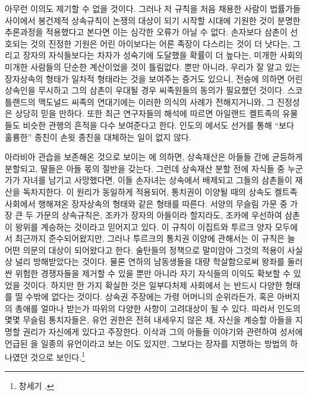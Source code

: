 아무런 이의도 제기할 수 없을 것이다.
그러나
저 규칙을 처음 채용한 사람이
법률가들 사이에서
봉건제적 상속규칙이
논쟁의 대상이 되기 시작할 시대에
기원한 것이
분명한 추론과정을
적용했다고 본다면 이는
심각한 오류가 아닐 수 없다.
손자보다 삼촌이 선호되는 것의 진정한 기원은
어린 아이보다는 어른 족장이 다스리는 것이 더 낫다는,
그리고 장자의 자식들보다는
차자가 성숙기에 도달했을 확률이 더 높다는,
미개한 사회의 미개한 사람들의 단순한 계산이었을 것이 틀림없다.
뿐만 아니라,
우리가 잘 알고 있는 장자상속의 형태가 일차적 형태라는 것을 보여주는
증거도 있으니,
전승에 의하면
어린 상속인을 무시하고 그의 삼촌이 우대될 경우
씨족원들의 동의가 필요했던 것이다.
스코틀랜드의 맥도널드 씨족의 연대기에는
이러한 의식의 사례가 전해지거니와,
그 진정성은 상당히 믿을 만하다.
또한 최근 연구자들의 해석에 따르면
아일랜드 켈트족의 유물들도 비슷한 관행의 흔적을 다수 보여준다고 한다.
인도의 에서도
선거를 통해
``보다 훌륭한'' 종친이
손윗 종친을
대체하는 일이 없지 않다.

아라비아 관습을 보존해온 것으로 보이는
에 의하면,
상속재산은 아들들 간에 균등하게 분할되고,
딸들은 아들 몫의 절반을 갖는다.
그런데 상속재산 분할 전에 자식들 중 누군가가 자녀를 남기고 사망했다면,
이들 손자녀는 상속에서 배제되고 그들의 삼촌들이 재산을 독차지한다.
이 원리가 동일하게 적용되어,
통치권이 이양될 때의 상속도
켈트족 사회에서 행해져온 장자상속의 형태와
같은 형태를 따른다.
서양의 무슬림 가문 중 가장 큰 두 가문의 상속규칙은,
조카가 장자의 아들이라 할지라도, 조카에 우선하여 삼촌이 왕위를
계승하는 것이라고 믿어지고 있다.
이 규칙이 이집트와 투르크 양자 모두에서
최근까지 준수되어왔지만,
그러나
투르크의 통치권 이양에 관해서는 이 규칙은
늘 어떤 의문의 대상이 되어왔다고 한다.
술탄들의 정책으로 말미암아 그것의 적용이 사실상 널리 방해받았다는 것이다.
물론 연하의 남동생들을 대량 학살함으로써
왕좌를 둘러싼 위험한 경쟁자들을 제거할 수 있을 뿐만 아니라
자기 자식들의 이익도 확보할 수 있었을 것이다.
하지만 한 가지 확실한 것은
일부다처제 사회에서
는 반드시 다양한 형태를 띨 수밖에 없다는 것이다.
상속권 주장에는
가령 어머니의 순위라든가, 혹은 아버지의 총애를 얼마나 받는가 따위의
다양한 사항이 고려대상이 될 수 있다.
따라서 인도의 몇몇 무슬림 통치자들은,
유언 권한은 전혀 내세우지 않은 채,
자신을 계승할 아들을 지명할 권리가 자신에게 있다고 주장한다.
이삭과 그의 아들들 이야기와 관련하여 성서에 언급된
을 일종의 유언이라고 보는 이도 있지만,
그보다는 장자를 지명하는 방법의 하나였던 것으로 보인다.\footnote{%
  창세기 . }


